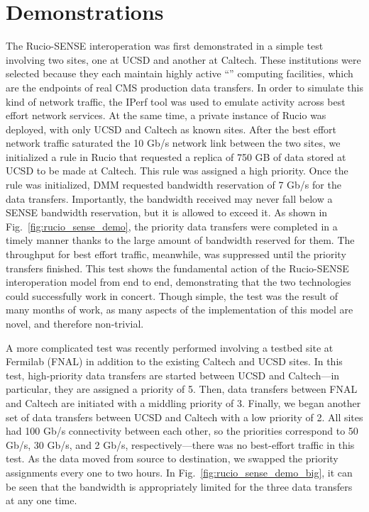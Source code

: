 \section{Demonstrations}
The Rucio-SENSE interoperation was first demonstrated in a simple test involving two sites, one at UCSD and another at Caltech. 
These institutions were selected because they each maintain highly active ``'' computing facilities, which are the endpoints of real CMS production data transfers. 
In order to simulate this kind of network traffic, the IPerf tool was used to emulate activity across best effort network services. 
At the same time, a private instance of Rucio was deployed, with only UCSD and Caltech as known sites. 
After the best effort network traffic saturated the 10 Gb/s network link between the two sites, we initialized a rule in Rucio that requested a replica of 750 GB of data stored at UCSD to be made at Caltech. 
This rule was assigned a high priority. 
Once the rule was initialized, DMM requested bandwidth reservation of 7 Gb/s for the data transfers. 
Importantly, the bandwidth received may never fall below a SENSE bandwidth reservation, but it is allowed to exceed it. 
As shown in Fig.~\ref{fig:rucio_sense_demo}, the priority data transfers were completed in a timely manner thanks to the large amount of bandwidth reserved for them. 
The throughput for best effort traffic, meanwhile, was suppressed until the priority transfers finished. 
This test shows the fundamental action of the Rucio-SENSE interoperation model from end to end, demonstrating that the two technologies could successfully work in concert. 
Though simple, the test was the result of many months of work, as many aspects of the implementation of this model are novel, and therefore non-trivial. 

A more complicated test was recently performed involving a testbed site at Fermilab (FNAL) in addition to the existing Caltech and UCSD sites. 
In this test, high-priority data transfers are started between UCSD and Caltech---in particular, they are assigned a priority of 5. 
Then, data transfers between FNAL and Caltech are initiated with a middling priority of 3. 
Finally, we began another set of data transfers between UCSD and Caltech with a low priority of 2. 
All sites had 100 Gb/s connectivity between each other, so the priorities correspond to 50 Gb/s, 30 Gb/s, and 2 Gb/s, respectively---there was no best-effort traffic in this test. 
As the data moved from source to destination, we swapped the priority assignments every one to two hours. 
In Fig.~\ref{fig:rucio_sense_demo_big}, it can be seen that the bandwidth is appropriately limited for the three data transfers at any one time. 

